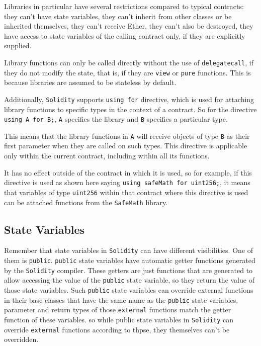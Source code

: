 Libraries in particular have several restrictions compared to typical
contracts: they can't have state variables, they can't inherit from
other classes or be inherited themselves, they can't receive Ether, they
can't also be destroyed, they have access to state variables of the
calling contract only, if they are explicitly supplied.

Library functions can only be called directly without the use of
\texttt{delegatecall}, if they do not modify the state, that is, if they
are \texttt{view} or \texttt{pure} functions. This is because libraries
are assumed to be stateless by default.

Additionally, \texttt{Solidity} supports \texttt{using\ for} directive,
which is used for attaching library functions to specific types in the
context of a contract. So for the directive \texttt{using\ A\ for\ B;},
\texttt{A} specifies the library and \texttt{B} specifies a particular
type.

This means that the library functions in \texttt{A} will receive objects
of type \texttt{B} as their first parameter when they are called on such
types. This directive is applicable only within the current contract,
including within all its functions.

It has no effect outside of the contract in which it is used, so for
example, if this directive is used as shown here saying
\texttt{using\ safeMath\ for\ uint256;}, it means that variables of type
\texttt{uint256} within that contract where this directive is used can
be attached functions from the \texttt{SafeMath} library.

\subsection{State Variables}\label{state-variables}

Remember that state variables in \texttt{Solidity} can have different
visibilities. One of them is \texttt{public}. \texttt{public} state
variables have automatic getter functions generated by the
\texttt{Solidity} compiler. These getters are just functions that are
generated to allow accessing the value of the \texttt{public} state
variable, so they return the value of those state variables. Such
\texttt{public} state variables can override external functions in their
base classes that have the same name as the \texttt{public} state
variables, parameter and return types of those \texttt{external}
functions match the getter function of these variables. so while public
state variables in \texttt{Solidity} can override \texttt{external}
functions according to thpse, they themselves can't be overridden.
